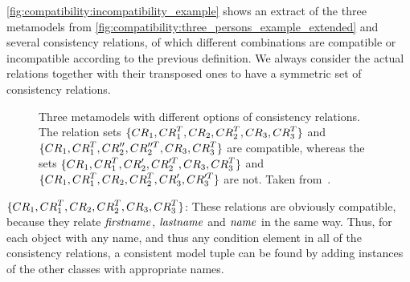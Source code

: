 
\begin{example}
\autoref{fig:compatibility:incompatibility_example} shows an extract of the three metamodels from \autoref{fig:compatibility:three_persons_example_extended} and several consistency relations, of which different combinations are compatible or incompatible according to the previous definition.
We always consider the actual relations together with their transposed ones to have a symmetric set of consistency relations.

\begin{figure}
    \centering
    
    \caption[Different incompatibility scenarios]{Three metamodels with different options of consistency relations. The relation sets $\setted{\consistencyrelation{CR}{1}, \consistencyrelation{CR}{1}^T,\consistencyrelation{CR}{2}, \consistencyrelation{CR}{2}^T, \consistencyrelation{CR}{3}, \consistencyrelation{CR}{3}^T}$ and $\setted{\consistencyrelation{CR}{1}, \consistencyrelation{CR}{1}^T, \consistencyrelation{CR}{2}'', \consistencyrelation{CR}{2}''^T, \consistencyrelation{CR}{3}, \consistencyrelation{CR}{3}^T}$ are compatible, whereas the sets $\setted{\consistencyrelation{CR}{1}, \consistencyrelation{CR}{1}^T, \consistencyrelation{CR}{2}', \consistencyrelation{CR}{2}'^T, \consistencyrelation{CR}{3}, \consistencyrelation{CR}{3}^T}$ and $\setted{\consistencyrelation{CR}{1}, \consistencyrelation{CR}{1}^T, \consistencyrelation{CR}{2}, \consistencyrelation{CR}{2}^T, \consistencyrelation{CR}{3}', \consistencyrelation{CR}{3}'^T}$ are not. Taken from~.}
    \label{fig:compatibility:incompatibility_example}
\end{figure}

\begin{properdescription}
\item[$\setted{\consistencyrelation{CR}{1}, \consistencyrelation{CR}{1}^T,\consistencyrelation{CR}{2}, \consistencyrelation{CR}{2}^T, \consistencyrelation{CR}{3}, \consistencyrelation{CR}{3}^T}$:]
These relations are obviously compatible, because they relate $\mathit{firstname}$, $\mathit{lastname}$ and $\mathit{name}$ in the same way. Thus, for each object with any name, and thus any condition element in all of the consistency relations, a consistent model tuple can be found by adding instances of the other classes with appropriate names.


\end{properdescription}
\end{example}
